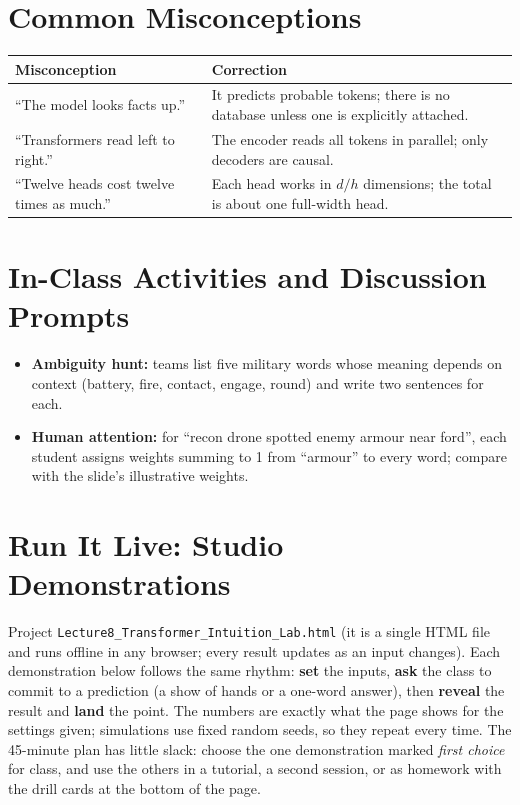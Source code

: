 \documentclass[11pt]{article}
\begin{document}
\section{Common Misconceptions}\begin{center}\small\renewcommand{\arraystretch}{1.35}\begin{tabularx}{\textwidth}{@{}>{\raggedright\arraybackslash}X >{\raggedright\arraybackslash}X@{}}\toprule\textbf{Misconception} & \textbf{Correction}\\\midrule``The model looks facts up.'' & It predicts probable tokens; there is no database unless one is explicitly attached.\\
``Transformers read left to right.'' & The encoder reads all tokens in parallel; only decoders are causal.\\
``Twelve heads cost twelve times as much.'' & Each head works in $d/h$ dimensions; the total is about one full-width head.\\\bottomrule\end{tabularx}\end{center}

\section{In-Class Activities and Discussion Prompts}\label{sec:act}\begin{itemize}\item \textbf{Ambiguity hunt:} teams list five military words whose meaning depends on context (battery, fire, contact, engage, round) and write two sentences for each.\item \textbf{Human attention:} for ``recon drone spotted enemy armour near ford'', each student assigns weights summing to 1 from ``armour'' to every word; compare with the slide's illustrative weights.\end{itemize}

\section{Run It Live: Studio Demonstrations}\label{sec:live}

Project \texttt{Lecture8\_Transformer\_Intuition\_Lab.html} (it is a single HTML file and runs offline in any browser; every result updates as an input changes). Each demonstration below follows the same rhythm: \textbf{set} the inputs, \textbf{ask} the class to commit to a prediction (a show of hands or a one-word answer), then \textbf{reveal} the result and \textbf{land} the point. The numbers are exactly what the page shows for the settings given; simulations use fixed random seeds, so they repeat every time. The 45-minute plan has little slack: choose the one demonstration marked \emph{first choice} for class, and use the others in a tutorial, a second session, or as homework with the drill cards at the bottom of the page.
\end{document}

